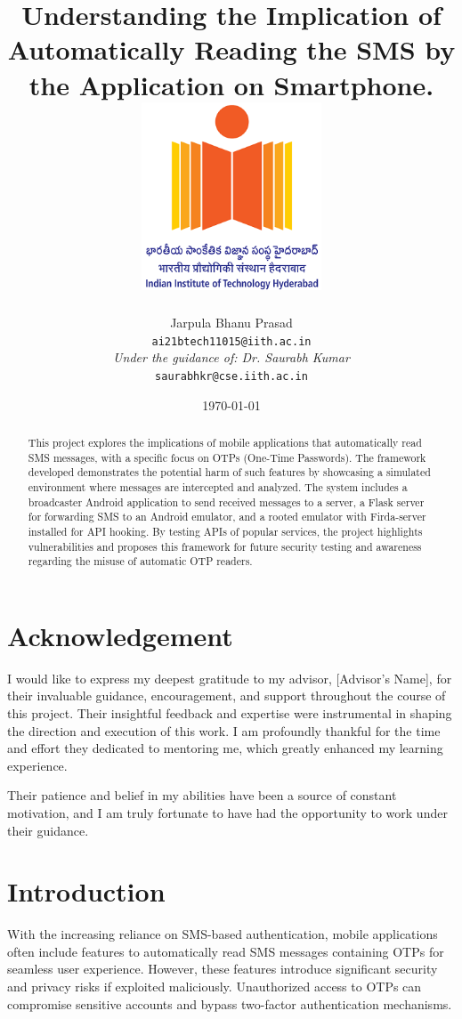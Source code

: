 \documentclass[a4paper,12pt]{article}
\title{
    Understanding the Implication of Automatically Reading the SMS by the Application on Smartphone.
    \vfill
    \includegraphics[width=0.4\textwidth]{../images/iith_logo.png}
    \vfill
    }
\author{Jarpula Bhanu Prasad \\ 
\texttt{ai21btech11015@iith.ac.in} \\ 
\textit{Under the guidance of: Dr. Saurabh Kumar} \\ 
\texttt{saurabhkr@cse.iith.ac.in}}
\date{\today}
\begin{document}
\maketitle
\pagebreak

\begin{abstract}
    This project explores the implications of mobile applications that automatically read SMS messages, with a specific focus on OTPs (One-Time Passwords). The framework developed demonstrates the potential harm of such features by showcasing a simulated environment where messages are intercepted and analyzed. The system includes a broadcaster Android application to send received messages to a server, a Flask server for forwarding SMS to an Android emulator, and a rooted emulator with Firda-server installed for API hooking. By testing APIs of popular services, the project highlights vulnerabilities and proposes this framework for future security testing and awareness regarding the misuse of automatic OTP readers.
\end{abstract}

\vfill

\tableofcontents

\vfill

\section*{Acknowledgement}
I would like to express my deepest gratitude to my advisor, [Advisor's Name], for their invaluable guidance, encouragement, and support throughout the course of this project. Their insightful feedback and expertise were instrumental in shaping the direction and execution of this work. I am profoundly thankful for the time and effort they dedicated to mentoring me, which greatly enhanced my learning experience.

Their patience and belief in my abilities have been a source of constant motivation, and I am truly fortunate to have had the opportunity to work under their guidance.
\pagebreak

\section{Introduction}
With the increasing reliance on SMS-based authentication, mobile applications often include features to automatically read SMS messages containing OTPs for seamless user experience. However, these features introduce significant security and privacy risks if exploited maliciously. Unauthorized access to OTPs can compromise sensitive accounts and bypass two-factor authentication mechanisms.
\end{document}
